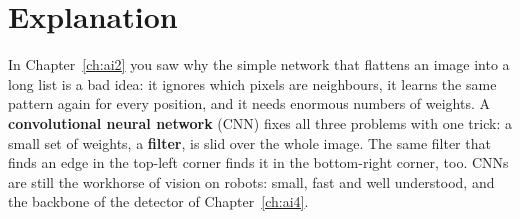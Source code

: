 \label{ch:ai3}

\section*{Explanation}
In Chapter~\ref{ch:ai2} you saw why the simple network that flattens an image into a long list is a bad idea: it ignores which pixels are neighbours, it learns the same pattern again for every position, and it needs enormous numbers of weights. A \textbf{convolutional neural network} (CNN) fixes all three problems with one trick: a small set of weights, a \textbf{filter}, is slid over the whole image. The same filter that finds an edge in the top-left corner finds it in the bottom-right corner, too. CNNs are still the workhorse of vision on robots: small, fast and well understood, and the backbone of the detector of Chapter~\ref{ch:ai4}.

